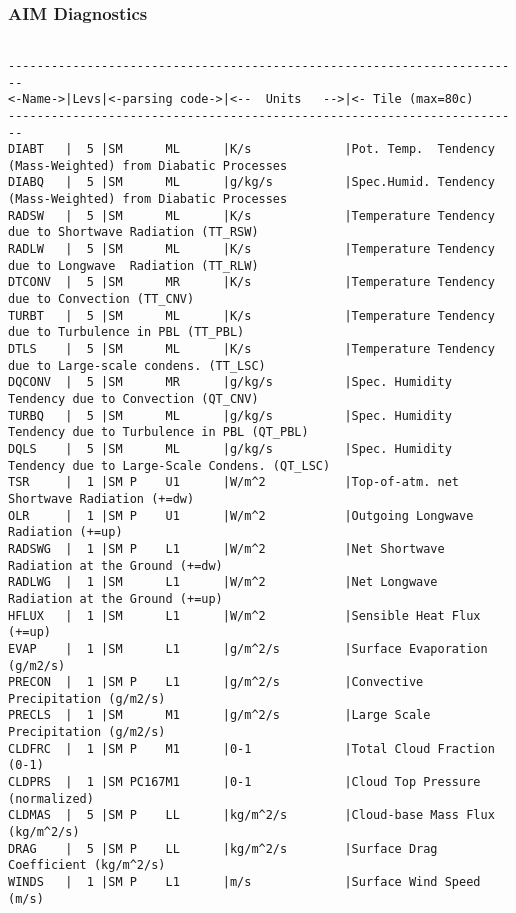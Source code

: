 \subsubsection{AIM Diagnostics}
\label{sec:pkg:aim:diagnostics}
\begin{verbatim}

------------------------------------------------------------------------
<-Name->|Levs|<-parsing code->|<--  Units   -->|<- Tile (max=80c) 
------------------------------------------------------------------------
DIABT   |  5 |SM      ML      |K/s             |Pot. Temp.  Tendency (Mass-Weighted) from Diabatic Processes
DIABQ   |  5 |SM      ML      |g/kg/s          |Spec.Humid. Tendency (Mass-Weighted) from Diabatic Processes
RADSW   |  5 |SM      ML      |K/s             |Temperature Tendency due to Shortwave Radiation (TT_RSW)
RADLW   |  5 |SM      ML      |K/s             |Temperature Tendency due to Longwave  Radiation (TT_RLW)
DTCONV  |  5 |SM      MR      |K/s             |Temperature Tendency due to Convection (TT_CNV)
TURBT   |  5 |SM      ML      |K/s             |Temperature Tendency due to Turbulence in PBL (TT_PBL)
DTLS    |  5 |SM      ML      |K/s             |Temperature Tendency due to Large-scale condens. (TT_LSC)
DQCONV  |  5 |SM      MR      |g/kg/s          |Spec. Humidity Tendency due to Convection (QT_CNV)
TURBQ   |  5 |SM      ML      |g/kg/s          |Spec. Humidity Tendency due to Turbulence in PBL (QT_PBL)
DQLS    |  5 |SM      ML      |g/kg/s          |Spec. Humidity Tendency due to Large-Scale Condens. (QT_LSC)
TSR     |  1 |SM P    U1      |W/m^2           |Top-of-atm. net Shortwave Radiation (+=dw)
OLR     |  1 |SM P    U1      |W/m^2           |Outgoing Longwave  Radiation (+=up)
RADSWG  |  1 |SM P    L1      |W/m^2           |Net Shortwave Radiation at the Ground (+=dw)
RADLWG  |  1 |SM      L1      |W/m^2           |Net Longwave  Radiation at the Ground (+=up)
HFLUX   |  1 |SM      L1      |W/m^2           |Sensible Heat Flux (+=up)
EVAP    |  1 |SM      L1      |g/m^2/s         |Surface Evaporation (g/m2/s)
PRECON  |  1 |SM P    L1      |g/m^2/s         |Convective  Precipitation (g/m2/s)
PRECLS  |  1 |SM      M1      |g/m^2/s         |Large Scale Precipitation (g/m2/s)
CLDFRC  |  1 |SM P    M1      |0-1             |Total Cloud Fraction (0-1)
CLDPRS  |  1 |SM PC167M1      |0-1             |Cloud Top Pressure (normalized)
CLDMAS  |  5 |SM P    LL      |kg/m^2/s        |Cloud-base Mass Flux  (kg/m^2/s)
DRAG    |  5 |SM P    LL      |kg/m^2/s        |Surface Drag Coefficient (kg/m^2/s)
WINDS   |  1 |SM P    L1      |m/s             |Surface Wind Speed  (m/s)

\end{verbatim}
